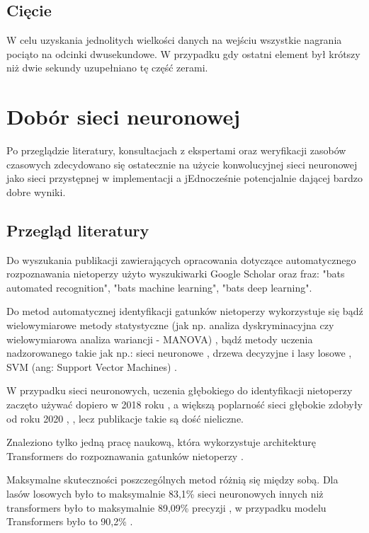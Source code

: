 \documentclass{sprz}
\begin{document}
\subsection{Cięcie}
W celu uzyskania jednolitych wielkości danych na wejściu wszystkie nagrania pociąto na odcinki dwusekundowe. W przypadku gdy ostatni element był krótszy niż dwie sekundy uzupełniano tę część zerami.

\section{Dobór sieci neuronowej}
Po przeglądzie literatury, konsultacjach z ekspertami oraz weryfikacji zasobów czasowych zdecydowano się ostatecznie na użycie konwolucyjnej sieci neuronowej jako sieci przystępnej w implementacji a jEdnocześnie potencjalnie dającej bardzo dobre wyniki.

\subsection{Przegląd literatury}
Do wyszukania publikacji zawierających opracowania dotyczące automatycznego rozpoznawania nietoperzy użyto wyszukiwarki Google Scholar oraz fraz: "bats automated recognition", "bats machine learning", "bats deep learning".

Do metod automatycznej identyfikacji gatunków nietoperzy wykorzystuje się
bądź wielowymiarowe metody statystyczne (jak np. analiza dyskryminacyjna czy wielowymiarowa analiza wariancji - MANOVA) \cite{bats-id-statistics}, bądź metody uczenia nadzorowanego \cite{bats-id-supervised} takie jak np.: sieci neuronowe \cite{bats-id-nn}, drzewa decyzyjne i lasy losowe \cite{bats-random-forest}, SVM (ang: Support Vector Machines) \cite{bats-id-svm}.

W przypadku sieci neuronowych, uczenia głębokiego do identyfikacji nietoperzy zaczęto używać dopiero w 2018 roku \cite{bats-id-dl2018}, a większą poplarność sieci głębokie zdobyły od roku 2020 \cite{bats-id-dl2020a}, \cite{bats-id-dl2020b}, lecz publikacje takie są dość nieliczne.

Znaleziono tylko jedną pracę naukową, która wykorzystuje architekturę Transformers do rozpoznawania gatunków nietoperzy \cite{bats-transformers}.

Maksymalne skuteczności poszczególnych metod różnią się między sobą. Dla lasów losowych było to maksymalnie 83,1\% \cite{bats-id-randomforest} sieci neuronowych innych niż transformers było to maksymalnie 89,09\% precyzji \cite{bats-id-dl}, w przypadku modelu Transformers było to 90,2\% \cite{bats-transformers}.
\end{document}
